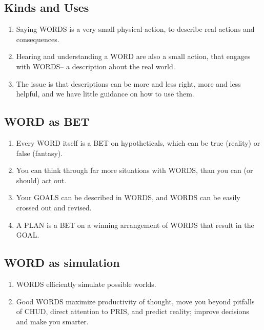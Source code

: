 \documentclass[
]{book}
\providecommand{\tightlist}{%
  \setlength{\itemsep}{0pt}\setlength{\parskip}{0pt}}
\begin{document}
\hypertarget{kinds-and-uses}{%
\subsection{Kinds and Uses}\label{kinds-and-uses}}

\begin{enumerate}
\def\labelenumi{\arabic{enumi}.}
\setcounter{enumi}{16}
\tightlist
\item
  Saying WORDS is a very small physical action, to describe real actions
  and consequences.
\item
  Hearing and understanding a WORD are also a small action, that
  engages with WORDS-- a description about the real world.
\item
  The issue is that descriptions can be more and less right, more and less
  helpful, and we have little guidance on how to use them.
\end{enumerate}

\hypertarget{word-as-bet}{%
\subsection{WORD as BET}\label{word-as-bet}}

\begin{enumerate}
\def\labelenumi{\arabic{enumi}.}
\setcounter{enumi}{19}
\tightlist
\item
  Every WORD itself is a BET on hypotheticals, which can be true (reality) or false (fantasy).
\item
  You can think through far more situations with WORDS, than you can
  (or should) act out.
\item
  Your GOALS can be described in WORDS, and WORDS can be easily
  crossed out and revised.
\item
  A PLAN is a BET on a winning arrangement of WORDS that result in the
  GOAL.
\end{enumerate}

\hypertarget{word-as-simulation}{%
\subsection{WORD as simulation}\label{word-as-simulation}}

\begin{enumerate}
\def\labelenumi{\arabic{enumi}.}
\setcounter{enumi}{23}
\tightlist
\item
  WORDS efficiently simulate possible worlds.
\item
  Good WORDS maximize productivity of thought, move you beyond
  pitfalls of CHUD, direct attention to PRIS, and predict reality; improve
  decisions and make you smarter.
\end{enumerate}
\end{document}
